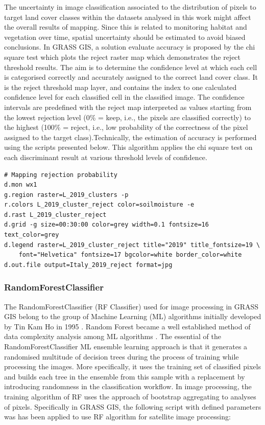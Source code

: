 \documentclass[preprint,12pt,authoryear]{elsarticle}
\begin{document}
The uncertainty in image classification associated to the distribution of pixels to target land cover classes within the datasets analysed in this work might affect the overall results of mapping. Since this is related to monitoring habitat and vegetation over time, spatial uncertainty should be estimated to avoid biased conclusions. In GRASS GIS, a solution evaluate accuracy is proposed by the chi square test which plots the reject raster map which demonstrates the reject threshold results. The aim is to determine the confidence level at which each cell is categorised correctly and accurately assigned to the correct land cover class. It is the reject threshold map layer, and contains the index to one calculated confidence level for each classified cell in the classified image. The confidence intervals are predefined with the reject map interpreted as values starting from the lowest rejection level (0\% = keep, i.e., the pixels are classified correctly) to the highest (100\% = reject, i.e., low probability of the correctness of the pixel assigned to the target class).Technically, the estimation of accuracy is performed using the scripts presented below. This algorithm applies the chi square test on each discriminant result at various threshold levels of confidence. 

\begin{footnotesize}
\begin{verbatim}
# Mapping rejection probability
d.mon wx1
g.region raster=L_2019_clusters -p
r.colors L_2019_cluster_reject color=soilmoisture -e
d.rast L_2019_cluster_reject
d.grid -g size=00:30:00 color=grey width=0.1 fontsize=16 text_color=grey
d.legend raster=L_2019_cluster_reject title="2019" title_fontsize=19 \
	font="Helvetica" fontsize=17 bgcolor=white border_color=white
d.out.file output=Italy_2019_reject format=jpg
\end{verbatim}
\end{footnotesize}

\subsubsection{RandomForestClassifier}

The RandomForestClassifier (RF Classifier) used for image processing in GRASS GIS belong to the group of Machine Learning (ML) algorithms initially developed by Tin Kam Ho in 1995 \cite{598994}. Random Forest became a well established method of data complexity analysis among ML algorithms \cite{990132}. The essential of the RandomForestClassifier ML ensemble learning approach is that it generates a randomised multitude of decision trees during the process of training while processing the images. More specifically, it uses the training set of classified pixels and builds each tree in the ensemble from this sample with a replacement by introducing randomness in the classification workflow. In image processing, the training algorithm of RF uses the approach of bootstrap aggregating to analyses of pixels. Specifically in GRASS GIS, the following script with defined parameters was has been applied to use RF algorithm for satellite image processing: 
\end{document}
